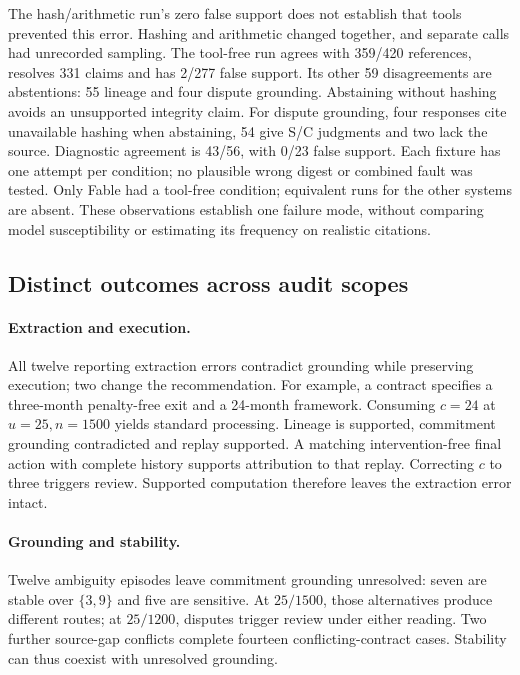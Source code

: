 \documentclass[sigconf,nonacm]{acmart}
\begin{document}
The hash/arithmetic run's zero false support does not establish that tools prevented this error. Hashing and arithmetic changed together, and separate calls had unrecorded sampling. The tool-free run agrees with 359/420 references, resolves 331 claims and has 2/277 false support. Its other 59 disagreements are abstentions: 55 lineage and four dispute grounding. Abstaining without hashing avoids an unsupported integrity claim. For dispute grounding, four responses cite unavailable hashing when abstaining, 54 give S/C judgments and two lack the source. Diagnostic agreement is 43/56, with 0/23 false support. Each fixture has one attempt per condition; no plausible wrong digest or combined fault was tested. Only Fable had a tool-free condition; equivalent runs for the other systems are absent. These observations establish one failure mode, without comparing model susceptibility or estimating its frequency on realistic citations.

\subsection{Distinct outcomes across audit scopes}

\paragraph{Extraction and execution.}
All twelve reporting extraction errors contradict grounding while preserving execution; two change the recommendation. For example, a contract specifies a three-month penalty-free exit and a 24-month framework. Consuming \(c=24\) at \(u=25,n=1500\) yields standard processing. Lineage is supported, commitment grounding contradicted and replay supported. A matching intervention-free final action with complete history supports attribution to that replay. Correcting \(c\) to three triggers review. Supported computation therefore leaves the extraction error intact.

\paragraph{Grounding and stability.}
Twelve ambiguity episodes leave commitment grounding unresolved: seven are stable over \(\{3,9\}\) and five are sensitive. At \(25/1500\), those alternatives produce different routes; at \(25/1200\), disputes trigger review under either reading. Two further source-gap conflicts complete fourteen conflicting-contract cases. Stability can thus coexist with unresolved grounding.
\end{document}
